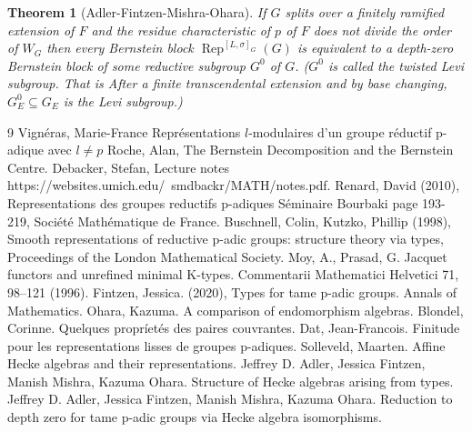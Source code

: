 \documentclass[8pt]{article}
\newtheorem{theorem}{Theorem} [section]
\DeclareMathOperator{\Rep}{Rep}
\begin{document}
\begin{theorem}[Adler-Fintzen-Mishra-Ohara]
  If $G$ splits over a finitely ramified extension of $F$ and the residue characteristic of $p$ of $F$ does not divide the order of $W_G$ then every Bernstein block $\Rep^{[L,\sigma]_G}(G)$ is equivalent to a depth-zero Bernstein block of some reductive subgroup $G^0$ of $G$. ($G^0$ is called the twisted Levi subgroup. That is After a finite transcendental extension and by base changing, $G_E^0\subseteq G_E$ is the Levi subgroup.)
\end{theorem}

\begin{thebibliography}{9}
 Vignéras, Marie-France Représentations $l$-modulaires d'un groupe réductif p-adique avec $l\not=p$
Roche, Alan, The Bernstein Decomposition and the Bernstein Centre.
 Debacker, Stefan, Lecture notes https://websites.umich.edu/~smdbackr/MATH/notes.pdf.
 Renard, David (2010), Representations des groupes reductifs p-adiques Séminaire Bourbaki page 193-219, Société Mathématique de France.
 Buschnell, Colin, Kutzko, Phillip (1998),  Smooth representations of reductive p-adic groups: structure theory via types, Proceedings of the London Mathematical Society.
 Moy, A., Prasad, G. Jacquet functors and unrefined minimal K-types. Commentarii Mathematici Helvetici 71, 98–121 (1996).
 Fintzen, Jessica. (2020), Types for tame p-adic groups. Annals of Mathematics.
 Ohara, Kazuma. A comparison of endomorphism algebras.
 Blondel, Corinne. Quelques propríetés des paires couvrantes.
 Dat, Jean-Francois. Finitude pour les representations lisses de groupes p-adiques.
 Solleveld, Maarten. Affine Hecke algebras and their representations.
 Jeffrey D. Adler, Jessica Fintzen, Manish Mishra, Kazuma Ohara. Structure of Hecke algebras arising from types.
 Jeffrey D. Adler, Jessica Fintzen, Manish Mishra, Kazuma Ohara. Reduction to depth zero for tame p-adic groups via Hecke algebra isomorphisms.
\end{thebibliography}
\end{document}
